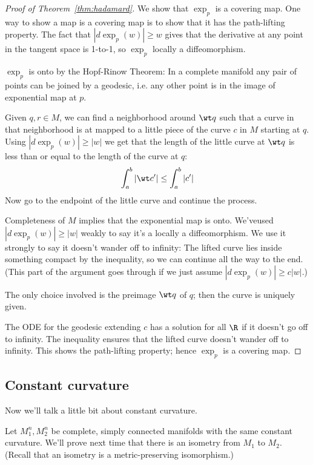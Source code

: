 \begin{proof}[Proof of Theorem~\ref{thm:hadamard}]
We show that $\exp_p$ is a covering map. One way to show a map is a covering map is to show that it has the path-lifting property. The fact that $|d\exp_p(w)|\ge w$
gives that the derivative at any point in the tangent space is 1-to-1, so $\exp_p$ locally a diffeomorphism. 

$\exp_p$ is onto by the Hopf-Rinow Theorem: %
In a complete manifold any pair of points can be joined by a geodesic, i.e. any other point is in the image of exponential map at $p$.

Given $q,r\in M$, we can find a neighborhood around $\wt q$ such that a curve in that neighborhood is at mapped to a little piece of the curve $c$ in $M$ starting at $q$. Using $|d\exp_p(w)|\ge |w|$ we get that the length of the little curve at $\wt q$ is less than or equal to the length of the curve at $q$:
\[
\int_a^b |\wt c'|\le \int_a^b |c'|
\]
Now go to the endpoint of the little curve and continue the process.


Completeness of $M$ implies that the exponential map is onto. We'veused $|d\exp_p(w)|\ge|w|$ weakly to say it's a locally a diffeomorphism. We use it strongly to say it doesn't wander off to infinity: The lifted curve lies inside something compact by the inequality, so we can continue all the way to the end. (This part of the argument goes through if we just assume $|d\exp_p(w)|\ge c|w|$.)

The only choice involved is the preimage $\wt q$ of $q$; then the curve is uniquely given. 

The ODE for the geodesic extending $c$ has a solution for all $\R$ if it  doesn't go off to infinity. The inequality ensures that the lifted curve doesn't wander off to infinity.
This shows the path-lifting property; hence $\exp_p$ is a covering map.
\end{proof}
\subsection{Constant curvature}
Now we'll talk a little bit about constant curvature.

Let $M_1^n,M_2^n$ be complete, simply connected manifolds with the same constant curvature. We'll prove next time that there is an isometry from $M_1$ to $M_2$. (Recall that an isometry is a metric-preserving isomorphism.)

